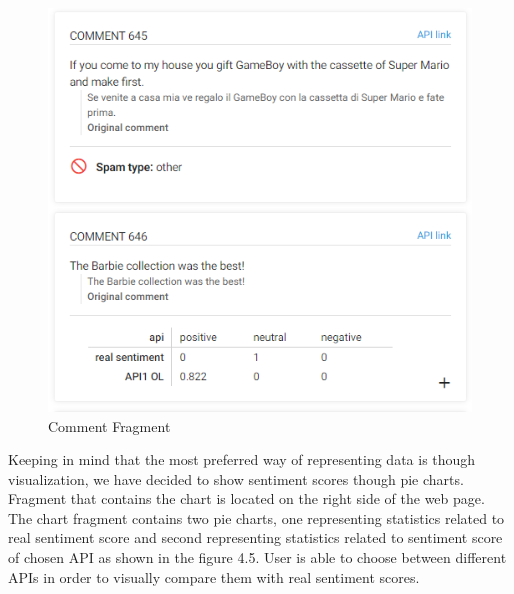\newpage

\begin{figure}[ht]
	\centering	
	\includegraphics[width=1\textwidth]{04-framework/03-user-interface/images/comment_fragment.png}
	\caption[Comment Fragment]{Comment Fragment \label{fig:comment-fragment}}
\end{figure}

Keeping in mind that the most preferred way of representing data is though visualization, we have decided to show sentiment scores though pie charts. Fragment that contains the chart is located on the right side of the web page. The chart fragment contains two pie charts, one representing statistics related to real sentiment score and second representing statistics related to sentiment score of chosen API as shown in the figure 4.5. User is able to choose between different APIs in order to visually compare them with real sentiment scores.

\newpage

